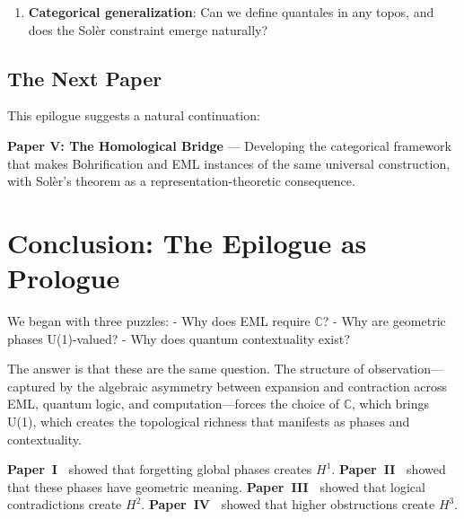 \documentclass[11pt]{article}
\providecommand{\tightlist}{%
  \setlength{\itemsep}{0pt}\setlength{\parskip}{0pt}}
\begin{document}
\begin{enumerate}
  \begin{itemize}
  \tightlist
  \item
    Are there quantum systems that ``want'' to be quaternionic (high \(H^3\))?
  \item
    Can we detect the ``branch choice'' of ln in quantum measurements?
  \end{itemize}
\item
  \textbf{Categorical generalization}: Can we define quantales in any topos, and does the Solèr constraint emerge naturally?
\end{enumerate}

\subsection{The Next Paper}
\label{the-next-paper}

This epilogue suggests a natural continuation:

\textbf{Paper V: The Homological Bridge} --- Developing the categorical framework that makes Bohrification and EML instances of the same universal construction, with Solèr's theorem as a representation-theoretic consequence.



\section{Conclusion: The Epilogue as Prologue}
\label{conclusion-the-epilogue-as-prologue}

We began with three puzzles: - Why does EML require $\mathbb{C}$? - Why are geometric phases U(1)-valued? - Why does quantum contextuality exist?

The answer is that these are the same question. The structure of observation---captured by the algebraic asymmetry between expansion and contraction across EML, quantum logic, and computation---forces the choice of $\mathbb{C}$, which brings U(1), which creates the topological richness that manifests as phases and contextuality.

\textbf{Paper~I~\cite{PaperI}} showed that forgetting global phases creates \(H^1\). \textbf{Paper~II~\cite{PaperII}} showed that these phases have geometric meaning. \textbf{Paper~III~\cite{PaperIII}} showed that logical contradictions create \(H^2\). \textbf{Paper~IV~\cite{PaperIV}} showed that higher obstructions create \(H^3\).
\end{document}
